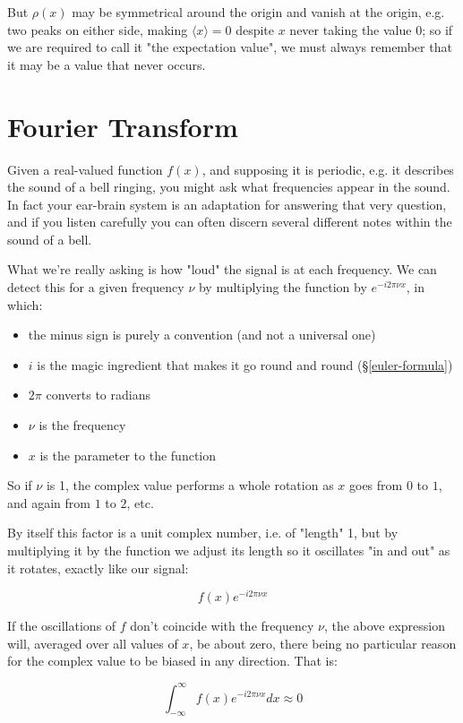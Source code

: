 But $\rho(x)$ may be symmetrical around the origin and vanish at the origin, e.g. two peaks on either side, making $\langle x \rangle = 0$ despite $x$ never taking the value $0$; so if we are required to call it "the expectation value", we must always remember that it may be a value that never occurs.

\section{Fourier Transform} \label{sec:fourier}

Given a real-valued function $f(x)$, and supposing it is periodic, e.g. it describes the sound of a bell ringing, you might ask what frequencies appear in the sound. In fact your ear-brain system is an adaptation for answering that very question, and if you listen carefully you can often discern several different notes within the sound of a bell.

What we're really asking is how "loud" the signal is at each frequency. We can detect this for a given frequency $\nu$ by multiplying the function by $e^{-i2\pi\nu x}$, in which:

\begin{itemize} 
    \item the minus sign is purely a convention (and not a universal one)
    \item $i$ is the magic ingredient that makes it go round and round (§\ref{euler-formula})
    \item $2\pi$ converts to radians
    \item $\nu$ is the frequency
    \item $x$ is the parameter to the function
\end{itemize}

So if $\nu$ is 1, the complex value performs a whole rotation as $x$ goes from $0$ to $1$, and again from $1$ to $2$, etc.

By itself this factor is a unit complex number, i.e. of "length" 1, but by multiplying it by the function we adjust its length so it oscillates "in and out" as it rotates, exactly like our signal:

$$f(x)e^{-i2\pi\nu x}$$

If the oscillations of $f$ don't coincide with the frequency $\nu$, the above expression will, averaged over all values of $x$, be about zero, there being no particular reason for the complex value to be biased in any direction. That is:

$$\int_{-\infty}^{\infty} f(x)e^{-i2\pi\nu x} dx \approx 0 $$

